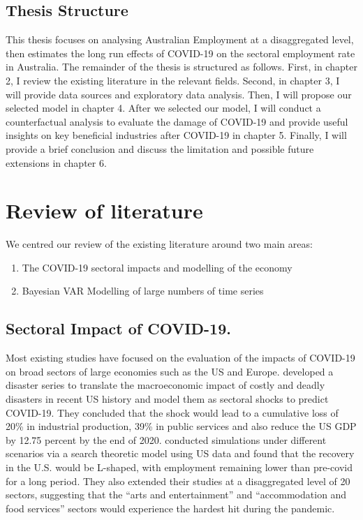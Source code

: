 \documentclass{monashthesis}
\begin{document}
\hypertarget{thesis-structure}{%
\section{Thesis Structure}\label{thesis-structure}}

This thesis focuses on analysing Australian Employment at a disaggregated level, then estimates the long run effects of COVID-19 on the sectoral employment rate in Australia. The remainder of the thesis is structured as follows. First, in chapter 2, I review the existing literature in the relevant fields. Second, in chapter 3, I will provide data sources and exploratory data analysis. Then, I will propose our selected model in chapter 4. After we selected our model, I will conduct a counterfactual analysis to evaluate the damage of COVID-19 and provide useful insights on key beneficial industries after COVID-19 in chapter 5. Finally, I will provide a brief conclusion and discuss the limitation and possible future extensions in chapter 6.

\clearpage

\hypertarget{review-of-literature}{%
\chapter{Review of literature}\label{review-of-literature}}

We centred our review of the existing literature around two main areas:

\begin{enumerate}
\def\labelenumi{\arabic{enumi}.}
\item
  The COVID-19 sectoral impacts and modelling of the economy
\item
  Bayesian VAR Modelling of large numbers of time series
\end{enumerate}

\hypertarget{sectoral-impact-of-covid-19.}{%
\section{Sectoral Impact of COVID-19.}\label{sectoral-impact-of-covid-19.}}

Most existing studies have focused on the evaluation of the impacts of COVID-19 on broad sectors of large economies such as the US and Europe. \textcite{ludvigson2020covid} developed a disaster series to translate the macroeconomic impact of costly and deadly disasters in recent US history and model them as sectoral shocks to predict COVID-19. They concluded that the shock would lead to a cumulative loss of 20\% in industrial production, 39\% in public services and also reduce the US GDP by 12.75 percent by the end of 2020. \textcite{gregory2020pandemic} conducted simulations under different scenarios via a search theoretic model using US data and found that the recovery in the U.S. would be L-shaped, with employment remaining lower than pre-covid for a long period. They also extended their studies at a disaggregated level of 20 sectors, suggesting that the ``arts and entertainment'' and ``accommodation and food services'' sectors would experience the hardest hit during the pandemic.
\end{document}
